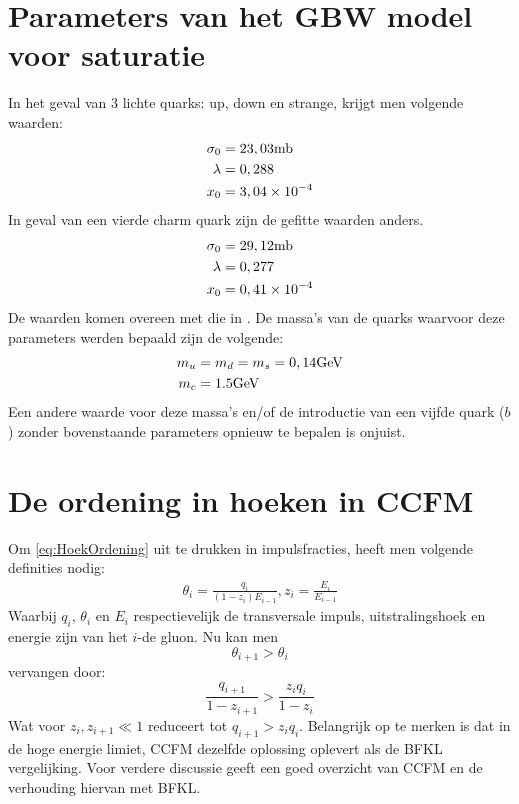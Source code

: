 \documentclass[a4paper,11pt]{article}
\numberwithin{equation}{section} %
\begin{document}
\section{Parameters van het GBW model voor saturatie} \label{app:GBWParameters}
In het geval van 3 lichte quarks: up, down en strange, krijgt men volgende waarden:
\begin{align}
\sigma_0 &= 23,03 \text{mb} \notag \\
\lambda &= 0,288 \\
x_0 &= 3,04 \times 10^{-4} \notag
\end{align}
In geval van een vierde charm quark zijn de gefitte waarden anders.
\begin{align}
\sigma_0 &= 29,12 \text{mb} \notag \\
\lambda &= 0,277 \\
x_0 &= 0,41 \times 10^{-4} \notag
\end{align}
De waarden komen overeen met die in \cite{GBW}.
De massa’s van de quarks waarvoor deze parameters werden bepaald zijn de volgende:
\begin{align}
m_u &= m_d = m_s = 0,14 \text{GeV}\notag \\
m_c &= 1.5 \text{GeV}
\end{align}
Een andere waarde voor deze massa’s en/of de introductie van een vijfde quark ($b$) zonder bovenstaande parameters opnieuw te bepalen is onjuist.

\section{De ordening in hoeken in CCFM} \label{app:CCFM}
Om \eqref{eq:HoekOrdening} uit te drukken in impulsfracties, heeft men volgende definities nodig:
\begin{align}
\theta_i = \frac{q_i}{(1-z_i)E_{i-1}}, z_i = \frac{E_i}{E_{i-1}}
\end{align}
Waarbij $q_i$, $\theta_i$ en $E_i$ respectievelijk de transversale impuls, uitstralingshoek en energie zijn van het $i$-de gluon.
Nu kan men
\begin{equation}
\theta_{i+1} > \theta_i
\end{equation}
 vervangen door:
\begin{equation}
 \frac{q_{i+1}}{1-z_{i+1}} > \frac{z_i q_i}{1-z_i}
\end{equation}
Wat voor $z_i, z_{i+1} \ll 1$ reduceert tot $q_{i+1} > z_i q_i$.
Belangrijk op te merken is dat in de hoge energie limiet, CCFM dezelfde oplossing oplevert als de BFKL vergelijking.
Voor verdere discussie geeft \cite{Vera} een goed overzicht van CCFM en de verhouding hiervan met BFKL.
\end{document}
